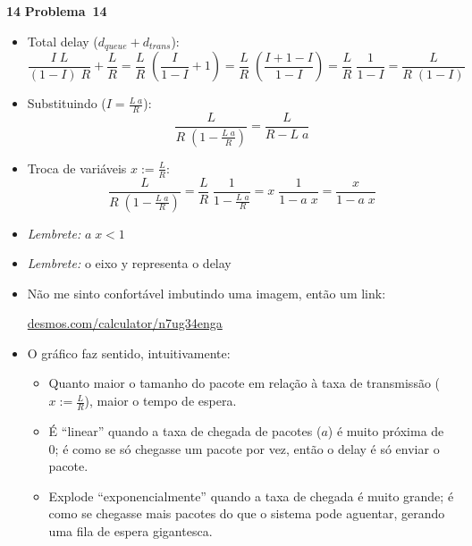 \documentclass{article}
\newcounter{exe-list}
\newenvironment{exe-list}
    {\begin{list}{\alph{exe-list}.}{\usecounter{exe-list}}}
    {\end{list}}
\newenvironment{exe}[2][Problema]
    {\newcommand{\opt}{(Opcional)}%
    \newcommand{\sketch}[1]{{\bfseries Rascunho:} ##1}%
    \medskip\par\noindent\ifthenelse{\equal{#1}{}}
        {\textbf{\large #2}}
        {\textbf{\large #1~#2}}%
    \medskip\par\noindent}
    {\medskip}
\begin{document}
\begin{exe}{14}
    \begin{exe-list}
    \item \begin{itemize}
            \item Total delay (\( d_{queue} + d_{trans} \)):
                \[
                    \frac{I \; L}{(1 - I) \; R} + \frac{L}{R}
                    = \frac{L}{R} \; \left(
                            \frac{I}{1 - I} + 1
                        \right)
                    = \frac{L}{R} \; \left(
                            \frac{I + 1 - I}{1 - I}
                        \right)
                    = \frac{L}{R} \; \frac{1}{1 - I}
                    = \frac{L}{R \; (1 - I)}
                \]
            \item Substituindo (\( I = \frac{L \; a}{R} \)):
                \[
                    \frac{L}{R \; (1 - \frac{L \; a}{R})}
                    = \frac{L}{R - L \; a}
                \]
        \end{itemize}
    \item \begin{itemize}
            \item Troca de variáveis \( x := \frac{L}{R} \):
                \[
                    \frac{L}{R \; (1 - \frac{L \; a}{R})}
                    = \frac{L}{R} \; \frac{1}{1 - \frac{L \; a}{R}}
                    = x \; \frac{1}{1 - a \; x}
                    = \frac{x}{1 - a \; x}
                \]
            \item \textit{Lembrete:} \(a \; x < 1\)
            \item \textit{Lembrete:} o eixo y representa o delay
            \item Não me sinto confortável imbutindo uma imagem,
                então um link: \par
                \href{https://www.desmos.com/calculator/n7ug34enga}
                {desmos.com/calculator/n7ug34enga}
            \item O gráfico faz sentido, intuitivamente:
            \begin{itemize}
                \item Quanto maior o tamanho do pacote
                    em relação à taxa de transmissão
                    (\(x := \frac{L}{R}\)),
                    maior o tempo de espera.
                \item É ``linear'' quando
                    a taxa de chegada de pacotes (\(a\))
                    é muito próxima de 0;
                    é como se só chegasse um pacote por vez,
                    então o delay é só enviar o pacote.
                \item Explode ``exponencialmente'' quando
                    a taxa de chegada é muito grande;
                    é como se chegasse mais pacotes do que
                    o sistema pode aguentar,
                    gerando uma fila de espera gigantesca.
            \end{itemize}
        \end{itemize}
    \end{exe-list}
\end{exe}
\end{document}
